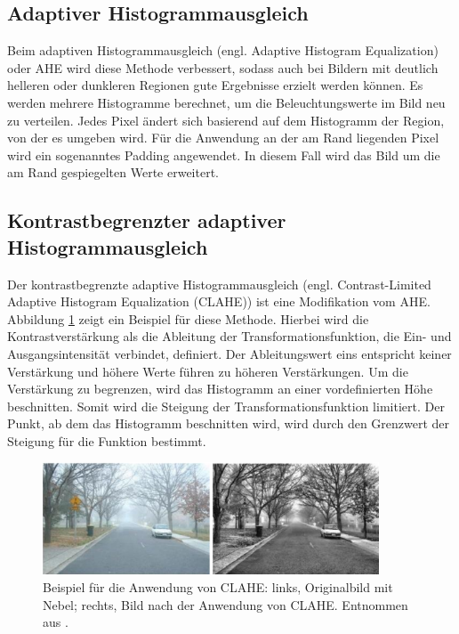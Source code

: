 \subsection{Adaptiver Histogrammausgleich}
Beim adaptiven Histogrammausgleich (engl. Adaptive Histogram Equalization) oder AHE wird diese Methode verbessert, sodass auch bei Bildern mit deutlich helleren oder dunkleren Regionen gute Ergebnisse erzielt werden können. Es werden mehrere Histogramme berechnet, um die Beleuchtungswerte im Bild neu zu verteilen. Jedes Pixel ändert sich basierend auf dem Histogramm der Region, von der es umgeben wird. Für die Anwendung an der am Rand liegenden Pixel wird ein sogenanntes Padding angewendet. In diesem Fall wird das Bild um die am Rand gespiegelten Werte erweitert. \cite{adaptive-hist-eq-and-its-variations}


\subsection{Kontrastbegrenzter adaptiver Histogrammausgleich}\label{sec:clahe-sec}
Der kontrastbegrenzte adaptive Histogrammausgleich (engl. Contrast-Limited Adaptive Histogram Equalization (CLAHE)) ist eine Modifikation vom AHE. Abbildung \ref{fig:clahe} zeigt ein Beispiel für diese Methode. Hierbei wird die Kontrastverstärkung als die Ableitung der Transformationsfunktion, die Ein- und Ausgangsintensität verbindet, definiert. Der Ableitungswert eins entspricht keiner Verstärkung und höhere Werte führen zu höheren Verstärkungen. Um die Verstärkung zu begrenzen, wird das Histogramm an einer vordefinierten Höhe beschnitten. Somit wird die Steigung der Transformationsfunktion limitiert. Der Punkt, ab dem das Histogramm beschnitten wird, wird durch den Grenzwert der Steigung für die Funktion bestimmt. \cite{adaptive-hist-eq-and-its-variations}

\begin{figure}[h!]
\centering
\includegraphics[width=10cm]{98_images/clahe.png}
\caption{Beispiel für die Anwendung von CLAHE: links, Originalbild mit Nebel; rechts, Bild nach der Anwendung von CLAHE. Entnommen aus \cite{clahe-based-enhancement-for-video}.}
\label{fig:clahe}
\end{figure} 


